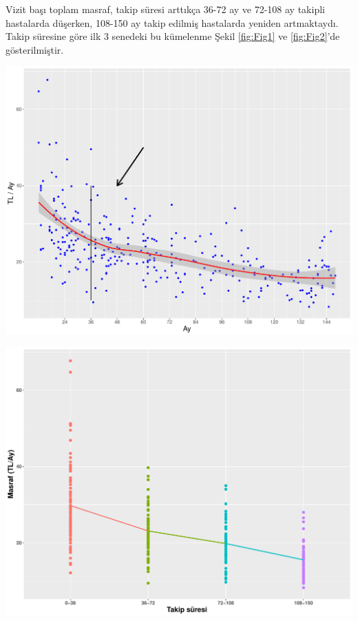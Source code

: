 Vizit başı toplam masraf, takip süresi arttıkça 36-72 ay ve 72-108 ay takipli hastalarda düşerken, 108-150 ay takip edilmiş hastalarda yeniden artmaktaydı. Takip süresine göre ilk 3 senedeki bu kümelenme Şekil \ref{fig:Fig1} ve \ref{fig:Fig2}'de gösterilmiştir.  
   
  
\begin{minipage}{0.49\textwidth}
 \begin{center}
 	\includegraphics[width=1\linewidth, height=0.3\textheight]{../Figures/Fig1}
 	\end{center}
 	  \label{fig:Fig1}	
\end{minipage}
\begin{minipage}{0.49\textwidth}
	\begin{center}
	\includegraphics[width=1\linewidth, height=0.3\textheight]{../Figures/Fig2}
	\end{center}
	  \label{fig:Fig2}
\end{minipage}\\  
  
